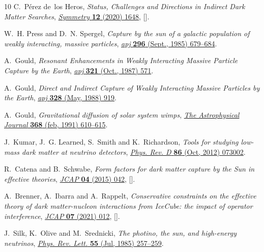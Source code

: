 \documentclass[11pt]{article}
\begin{document}
\begin{thebibliography}{10}
C.~P\'erez de~los Heros, \emph{{Status, Challenges and Directions in Indirect
  Dark Matter Searches}},
  \href{https://doi.org/10.3390/sym12101648}{\emph{Symmetry} {\bfseries 12}
  (2020) 1648}, [\href{https://arxiv.org/abs/2008.11561}{{}}].

W.~H. {Press} and D.~N. {Spergel}, \emph{{Capture by the sun of a galactic
  population of weakly interacting, massive particles}},
  \href{https://doi.org/10.1086/163485}{\emph{apj} {\bfseries 296} (Sept.,
  1985) 679--684}.

A.~{Gould}, \emph{{Resonant Enhancements in Weakly Interacting Massive Particle
  Capture by the Earth}}, \href{https://doi.org/10.1086/165653}{\emph{apj}
  {\bfseries 321} (Oct., 1987) 571}.

A.~{Gould}, \emph{{Direct and Indirect Capture of Weakly Interacting Massive
  Particles by the Earth}}, \href{https://doi.org/10.1086/166347}{\emph{apj}
  {\bfseries 328} (May, 1988) 919}.

A.~Gould, \emph{Gravitational diffusion of solar system wimps},
  \href{https://doi.org/10.1086/169726}{\emph{The Astrophysical Journal}
  {\bfseries 368} (feb, 1991) 610--615}.

J.~Kumar, J.~G. Learned, S.~Smith and K.~Richardson, \emph{Tools for studying
  low-mass dark matter at neutrino detectors},
  \href{https://doi.org/10.1103/PhysRevD.86.073002}{\emph{Phys. Rev. D}
  {\bfseries 86} (Oct, 2012) 073002}.

R.~Catena and B.~Schwabe, \emph{{Form factors for dark matter capture by the
  Sun in effective theories}},
  \href{https://doi.org/10.1088/1475-7516/2015/04/042}{\emph{JCAP} {\bfseries
  04} (2015) 042}, [\href{https://arxiv.org/abs/1501.03729}{{}}].

A.~Brenner, A.~Ibarra and A.~Rappelt, \emph{{Conservative constraints on the
  effective theory of dark matter-nucleon interactions from IceCube: the impact
  of operator interference}},
  \href{https://doi.org/10.1088/1475-7516/2021/07/012}{\emph{JCAP} {\bfseries
  07} (2021) 012}, [\href{https://arxiv.org/abs/2011.02929}{{}}].

J.~Silk, K.~Olive and M.~Srednicki, \emph{The photino, the sun, and high-energy
  neutrinos}, \href{https://doi.org/10.1103/PhysRevLett.55.257}{\emph{Phys.
  Rev. Lett.} {\bfseries 55} (Jul, 1985) 257--259}.


\end{thebibliography}
\end{document}
